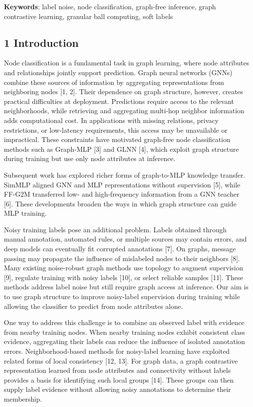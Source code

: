 \textbf{Keywords}: label noise, node classification, graph-free inference, graph contrastive learning, granular ball computing, soft labels

\subsection{1 Introduction}\label{introduction}

Node classification is a fundamental task in graph learning, where node attributes and relationships jointly support prediction. Graph neural networks (GNNs) combine these sources of information by aggregating representations from neighboring nodes {[}1, 2{]}. Their dependence on graph structure, however, creates practical difficulties at deployment. Predictions require access to the relevant neighborhoods, while retrieving and aggregating multi-hop neighbor information adds computational cost. In applications with missing relations, privacy restrictions, or low-latency requirements, this access may be unavailable or impractical. These constraints have motivated graph-free node classification methods such as Graph-MLP {[}3{]} and GLNN {[}4{]}, which exploit graph structure during training but use only node attributes at inference.

Subsequent work has explored richer forms of graph-to-MLP knowledge transfer. SimMLP aligned GNN and MLP representations without supervision {[}5{]}, while FF-G2M transferred low- and high-frequency information from a GNN teacher {[}6{]}. These developments broaden the ways in which graph structure can guide MLP training.

Noisy training labels pose an additional problem. Labels obtained through manual annotation, automated rules, or multiple sources may contain errors, and deep models can eventually fit corrupted annotations {[}7{]}. On graphs, message passing may propagate the influence of mislabeled nodes to their neighbors {[}8{]}. Many existing noise-robust graph methods use topology to augment supervision {[}9{]}, regulate training with noisy labels {[}10{]}, or select reliable samples {[}11{]}. These methods address label noise but still require graph access at inference. Our aim is to use graph structure to improve noisy-label supervision during training while allowing the classifier to predict from node attributes alone.

One way to address this challenge is to combine an observed label with evidence from nearby training nodes. When nearby training nodes exhibit consistent class evidence, aggregating their labels can reduce the influence of isolated annotation errors. Neighborhood-based methods for noisy-label learning have exploited related forms of local consistency {[}12, 13{]}. For graph data, a graph contrastive representation learned from node attributes and connectivity without labels provides a basis for identifying such local groups {[}14{]}. These groups can then supply label evidence without allowing noisy annotations to determine their membership.


